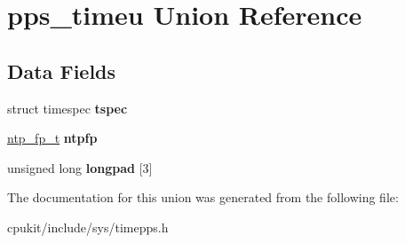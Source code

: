 \hypertarget{unionpps__timeu}{}\section{pps\+\_\+timeu Union Reference}
\label{unionpps__timeu}
\subsection*{Data Fields}
\begin{DoxyCompactItemize}
\item 
\mbox{\label{unionpps__timeu_ac780b1670f2c3ce923ee6d906316e937}} 
struct timespec {\bfseries tspec}
\item 
\mbox{\label{unionpps__timeu_a98ca0ce670427ee7063d6a0973fa2fdc}} 
\mbox{\hyperlink{structntp__fp}{ntp\+\_\+fp\+\_\+t}} {\bfseries ntpfp}
\item 
\mbox{\label{unionpps__timeu_ac158b37101e6ed75663caf47fb71cac9}} 
unsigned long {\bfseries longpad} \mbox{[}3\mbox{]}
\end{DoxyCompactItemize}


The documentation for this union was generated from the following file\+:\begin{DoxyCompactItemize}
\item 
cpukit/include/sys/timepps.\+h\end{DoxyCompactItemize}
